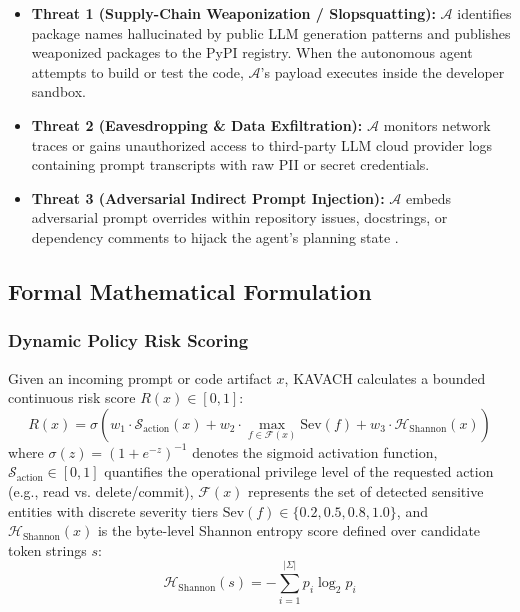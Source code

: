 \documentclass[conference]{IEEEtran}
\begin{document}
\begin{itemize}
    \item \textbf{Threat 1 (Supply-Chain Weaponization / Slopsquatting):} $\mathcal{A}$ identifies package names hallucinated by public LLM generation patterns and publishes weaponized packages to the PyPI registry. When the autonomous agent attempts to build or test the code, $\mathcal{A}$'s payload executes inside the developer sandbox.
    \item \textbf{Threat 2 (Eavesdropping \& Data Exfiltration):} $\mathcal{A}$ monitors network traces or gains unauthorized access to third-party LLM cloud provider logs containing prompt transcripts with raw PII or secret credentials.
    \item \textbf{Threat 3 (Adversarial Indirect Prompt Injection):} $\mathcal{A}$ embeds adversarial prompt overrides within repository issues, docstrings, or dependency comments to hijack the agent's planning state \cite{greshake2023promptinjection}.
\end{itemize}

\subsection{Formal Mathematical Formulation}
\subsubsection{Dynamic Policy Risk Scoring}
Given an incoming prompt or code artifact $x$, KAVACH calculates a bounded continuous risk score $R(x) \in [0, 1]$:
\begin{equation}
R(x) = \sigma \left( w_1 \cdot \mathcal{S}_{\text{action}}(x) + w_2 \cdot \max_{f \in \mathcal{F}(x)} \text{Sev}(f) + w_3 \cdot \mathcal{H}_{\text{Shannon}}(x) \right)
\label{eq:risk}
\end{equation}
where $\sigma(z) = (1 + e^{-z})^{-1}$ denotes the sigmoid activation function, $\mathcal{S}_{\text{action}} \in [0, 1]$ quantifies the operational privilege level of the requested action (e.g., read vs. delete/commit), $\mathcal{F}(x)$ represents the set of detected sensitive entities with discrete severity tiers $\text{Sev}(f) \in \{0.2, 0.5, 0.8, 1.0\}$, and $\mathcal{H}_{\text{Shannon}}(x)$ is the byte-level Shannon entropy score \cite{shannon1948mathematical} defined over candidate token strings $s$:
\begin{equation}
\mathcal{H}_{\text{Shannon}}(s) = -\sum_{i=1}^{|\Sigma|} p_i \log_2 p_i
\label{eq:entropy}
\end{equation}
\end{document}
